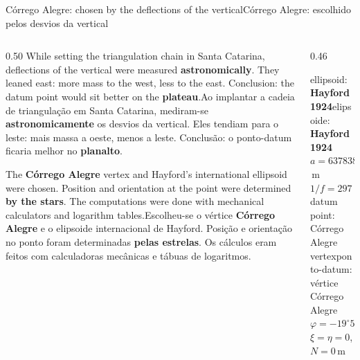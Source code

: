\documentclass[aspectratio=169,11pt]{beamer}
\newcommand{\tr}[2]{\ifEN#2\else#1\fi}
\newcommand{\bnum}[1]{\ifmmode\textcolor{mTeal}{\mathbf{#1}}\else\textbf{\textcolor{mTeal}{#1}}\fi}
\begin{document}
\begin{frame}{\tr{Córrego Alegre: escolhido pelos desvios da vertical}{Córrego Alegre: chosen
    by the deflections of the vertical}}
  \begin{columns}[T]
    \begin{column}{0.50\textwidth}
      \small
      \tr{Ao implantar a cadeia de triangulação em Santa Catarina, mediram-se
      \textbf{astronomicamente} os desvios da vertical. Eles tendiam para o leste: mais massa a
      oeste, menos a leste. Conclusão: o ponto-datum ficaria melhor no \bnum{planalto}.}{While
      setting the triangulation chain in Santa Catarina, deflections of the vertical were
      measured \textbf{astronomically}. They leaned east: more mass to the west, less to the
      east. Conclusion: the datum point would sit better on the \bnum{plateau}.}
      \medskip

      \tr{Escolheu-se o vértice \textbf{Córrego Alegre} e o elipsoide internacional de Hayford.
      Posição e orientação no ponto foram determinadas \textbf{pelas estrelas}. Os cálculos eram
      feitos com calculadoras mecânicas e tábuas de logaritmos.}{The \textbf{Córrego Alegre}
      vertex and Hayford's international ellipsoid were chosen. Position and orientation at the
      point were determined \textbf{by the stars}. The computations were done with mechanical
      calculators and logarithm tables.}
    \end{column}
    \begin{column}{0.46\textwidth}
      \begin{regra}[title={\tr{Datum Córrego Alegre}{Córrego Alegre datum}}]
        \small
        \tr{elipsoide: \textbf{Hayford 1924}}{ellipsoid: \textbf{Hayford 1924}}\\
        $a=\num{6378388}$\,m\quad $1/f=\num{297}$\\[3pt]
        \tr{ponto-datum: vértice Córrego Alegre}{datum point: Córrego Alegre vertex}\\
        $\varphi=-19^\circ 50' 14{,}91''$\\
        $\xi=\eta=0$,\quad $N=0$\,m
      \end{regra}
    \end{column}
  \end{columns}
\end{frame}
\end{document}
